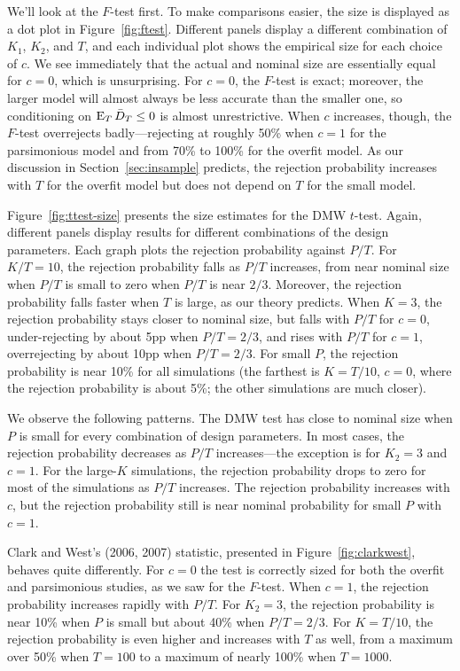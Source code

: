 \documentclass[12pt]{article}
\begin{document}
We'll look at the $F$-test first.  To make comparisons easier, the size
is displayed as a dot plot in Figure~\ref{fig:ftest}.  Different
panels display a different combination of $K_1$, $K_2$, and $T$, and
each individual plot shows the empirical size for each choice of $c$.
We see immediately that the actual and nominal size are essentially
equal for $c = 0$, which is unsurprising.  For $c = 0$, the $F$-test is
exact; moreover, the larger model will almost always be less accurate
than the smaller one, so conditioning on $\operatorname{E}_T \bar{D}_{T} \leq 0$ is
almost unrestrictive.  When $c$ increases, though, the $F$-test
overrejects badly---rejecting at roughly 50\% when $c = 1$ for the
parsimonious model and from 70\% to 100\% for the overfit model.  As
our discussion in Section~\ref{sec:insample} predicts, the rejection
probability increases with $T$ for the overfit model but does not
depend on $T$ for the small model.

Figure~\ref{fig:ttest-size} presents the size estimates for the DMW
$t$-test.  Again, different panels display results for different
combinations of the design parameters.  Each graph plots the rejection
probability against $P/T$.  For $K/T=10$, the rejection probability
falls as $P/T$ increases, from near nominal size when $P/T$ is small
to zero when $P/T$ is near $2/3$.  Moreover, the rejection probability
falls faster when $T$ is large, as our theory predicts.  When $K=3$,
the rejection probability stays closer to nominal size, but falls with
$P/T$ for $c=0$, under-rejecting by about 5pp when $P/T = 2/3$, and
rises with $P/T$ for $c=1$, overrejecting by about 10pp when
$P/T=2/3$.  For small $P$, the rejection probability is near 10\% for
all simulations (the farthest is $K=T/10$, $c=0$, where the rejection
probability is about 5\%; the other simulations are much closer).

We observe the following patterns.  The
DMW test has close to nominal size when $P$ is small for every
combination of design parameters.  In most cases, the rejection
probability decreases as $P/T$ increases---the exception is for $K_2 =
3$ and $c=1$.  For the large-$K$ simulations, the rejection
probability drops to zero for most of the simulations as $P/T$
increases.  The rejection probability increases with $c$, but the
rejection probability still is near nominal probability for small $P$
with $c=1$.

Clark and West's (2006, 2007) statistic, presented in
Figure~\ref{fig:clarkwest}, behaves quite differently.  For $c=0$ the
test is correctly sized for both the overfit and parsimonious studies,
as we saw for the $F$-test.  When $c=1$, the rejection probability
increases rapidly with $P/T$.  For $K_2=3$, the rejection probability
is near 10\% when $P$ is small but about 40\% when $P/T = 2/3$.  For
$K=T/10$, the rejection probability is even higher and increases with
$T$ as well, from a maximum over 50\% when $T=100$ to a maximum of
nearly 100\% when $T=1000$.
\end{document}
